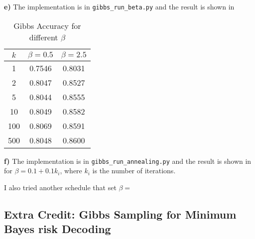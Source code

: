 \documentclass{article}
\begin{document}
\textbf{e)}
The implementation is in \texttt{gibbs\_run\_beta.py} and the result is shown in 

\begin{table}
\centering
\begin{tabular}{c|c|c}
\textbf{$k$} & \textbf{$\beta = 0.5$} & \textbf{$\beta=2.5$} \\\hline
1 & 0.7546 & 0.8031 \\\hline
2 & 0.8047 & 0.8527\\\hline
5 & 0.8044 & 0.8555 \\\hline
10 & 0.8049 & 0.8582 \\\hline
100 & 0.8069 & 0.8591 \\\hline
500 & 0.8048 & 0.8600 \\\hline
\end{tabular}
\caption{Gibbs Accuracy for different $\beta$}
\label{tab:gibbsbeta}
\end{table}

\textbf{f)}
The implementation is in \texttt{gibbs\_run\_annealing.py} and the result is shown in  for 
$\beta = 0.1 + 0.1k_i$, where $k_i$ is the number of iterations.

I also tried another schedule that set $\beta = $

\subsection{Extra Credit: Gibbs Sampling for Minimum Bayes risk Decoding}
\end{document}
